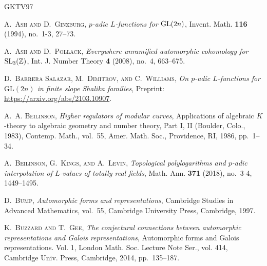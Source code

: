 \documentclass[10pt,reqno,a4paper]{amsart}
\begin{document}
\renewcommand{\MRhref}[1]{\relax}
\providecommand{\bysame}{\leavevmode\hbox to3em{\hrulefill}\thinspace}
\providecommand{\MR}[1]{}
\providecommand{\href}[2]{#2}
\newcommand{\articlehref}[2]{\href{#1}{#2}}
\begin{thebibliography}{GKTV97}

\textsc{A.~Ash and D.~Ginzburg},
  \articlehref{https://0-doi-org.pugwash.lib.warwick.ac.uk/10.1007/BF01231556}{\emph{{$p$}-adic
  {$L$}-functions for {${\rm GL}(2n)$}}}, Invent. Math. \textbf{116} (1994),
  no.~1-3, 27--73. \MR{1253188}

\textsc{A.~Ash and D.~Pollack},
  \articlehref{https://doi.org/10.1142/S1793042108001602}{\emph{Everywhere
  unramified automorphic cohomology for {${\rm SL}_3(\mathbb{Z})$}}}, Int. J.
  Number Theory \textbf{4} (2008), no.~4, 663--675. \MR{2441799}

\textsc{D.~{Barrera Salazar}, M.~Dimitrov, and C.~Williams}, \emph{On $p$-adic
  {$L$}-functions for $\mathrm{{GL}}(2n)$ in finite slope {S}halika families},
  Preprint: \url{https://arxiv.org/abs/2103.10907}.

\textsc{A.~A. Beilinson},
  \articlehref{https://0-doi-org.pugwash.lib.warwick.ac.uk/10.1090/conm/055.1/862627}{\emph{Higher
  regulators of modular curves}}, Applications of algebraic {$K$}-theory to
  algebraic geometry and number theory, {P}art {I}, {II} ({B}oulder, {C}olo.,
  1983), Contemp. Math., vol.~55, Amer. Math. Soc., Providence, RI, 1986,
  pp.~1--34. \MR{862627}

\textsc{A.~Beilinson, G.~Kings, and A.~Levin},
  \articlehref{https://0-doi-org.pugwash.lib.warwick.ac.uk/10.1007/s00208-018-1645-4}{\emph{Topological
  polylogarithms and {$p$}-adic interpolation of {$L$}-values of totally real
  fields}}, Math. Ann. \textbf{371} (2018), no.~3-4, 1449--1495. \MR{3831278}

\textsc{D.~Bump},
  \articlehref{https://0-doi-org.pugwash.lib.warwick.ac.uk/10.1017/CBO9780511609572}{\emph{Automorphic
  forms and representations}}, Cambridge Studies in Advanced Mathematics,
  vol.~55, Cambridge University Press, Cambridge, 1997. \MR{1431508}

\textsc{K.~Buzzard and T.~Gee},
  \articlehref{https://0-doi-org.pugwash.lib.warwick.ac.uk/10.1017/CBO9781107446335.006}{\emph{The
  conjectural connections between automorphic representations and {G}alois
  representations}}, Automorphic forms and {G}alois representations. {V}ol. 1,
  London Math. Soc. Lecture Note Ser., vol. 414, Cambridge Univ. Press,
  Cambridge, 2014, pp.~135--187. \MR{3444225}


\end{thebibliography}
\end{document}
